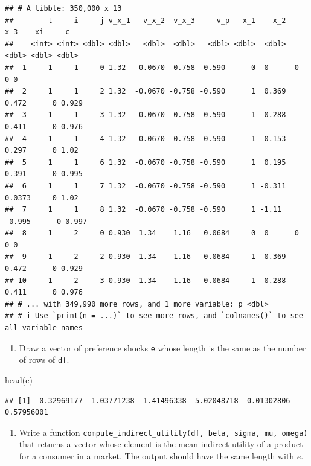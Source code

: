 \documentclass[
]{book}
\newenvironment{Shaded}{\begin{snugshade}}{\end{snugshade}}
\newcommand{\FunctionTok}[1]{\textcolor[rgb]{0.00,0.00,0.00}{#1}}
\newcommand{\NormalTok}[1]{#1}
\providecommand{\tightlist}{%
  \setlength{\itemsep}{0pt}\setlength{\parskip}{0pt}}
\begin{document}
\begin{verbatim}
## # A tibble: 350,000 x 13
##        t     i     j v_x_1   v_x_2  v_x_3     v_p   x_1    x_2     x_3    xi     c
##    <int> <int> <dbl> <dbl>   <dbl>  <dbl>   <dbl> <dbl>  <dbl>   <dbl> <dbl> <dbl>
##  1     1     1     0 1.32  -0.0670 -0.758 -0.590      0  0      0          0 0    
##  2     1     1     2 1.32  -0.0670 -0.758 -0.590      1  0.369  0.472      0 0.929
##  3     1     1     3 1.32  -0.0670 -0.758 -0.590      1  0.288  0.411      0 0.976
##  4     1     1     4 1.32  -0.0670 -0.758 -0.590      1 -0.153  0.297      0 1.02 
##  5     1     1     6 1.32  -0.0670 -0.758 -0.590      1  0.195  0.391      0 0.995
##  6     1     1     7 1.32  -0.0670 -0.758 -0.590      1 -0.311  0.0373     0 1.02 
##  7     1     1     8 1.32  -0.0670 -0.758 -0.590      1 -1.11  -0.995      0 0.997
##  8     1     2     0 0.930  1.34    1.16   0.0684     0  0      0          0 0    
##  9     1     2     2 0.930  1.34    1.16   0.0684     1  0.369  0.472      0 0.929
## 10     1     2     3 0.930  1.34    1.16   0.0684     1  0.288  0.411      0 0.976
## # ... with 349,990 more rows, and 1 more variable: p <dbl>
## # i Use `print(n = ...)` to see more rows, and `colnames()` to see all variable names
\end{verbatim}

\begin{enumerate}
\def\labelenumi{\arabic{enumi}.}
\setcounter{enumi}{5}
\tightlist
\item
  Draw a vector of preference shocks \texttt{e} whose length is the same as the number of rows of \texttt{df}.
\end{enumerate}

\begin{Shaded}
\begin{Highlighting}[]
\FunctionTok{head}\NormalTok{(e)}
\end{Highlighting}
\end{Shaded}

\begin{verbatim}
## [1]  0.32969177 -1.03771238  1.41496338  5.02048718 -0.01302806  0.57956001
\end{verbatim}

\begin{enumerate}
\def\labelenumi{\arabic{enumi}.}
\setcounter{enumi}{6}
\tightlist
\item
  Write a function \texttt{compute\_indirect\_utility(df,\ beta,\ sigma,\ mu,\ omega)} that returns a vector whose element is the mean indirect utility of a product for a consumer in a market. The output should have the same length with \(e\).
\end{enumerate}
\end{document}

